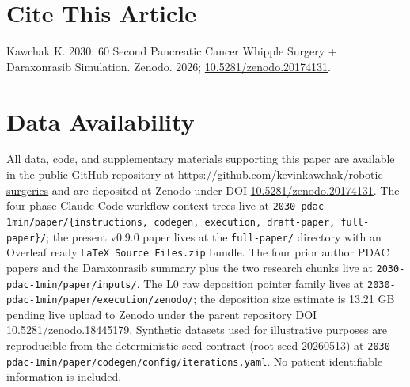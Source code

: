 {}
\section*{Cite This Article}
\label{sec:cite}

Kawchak K. 2030: 60 Second Pancreatic Cancer Whipple Surgery +
Daraxonrasib Simulation. Zenodo. 2026;
\href{https://doi.org/10.5281/zenodo.20174131}{10.5281/zenodo.20174131}.

{}
\section*{Data Availability}
\label{sec:data}

All data, code, and supplementary materials supporting this paper
are available in the public GitHub repository at
\url{https://github.com/kevinkawchak/robotic-surgeries} and are
deposited at Zenodo under DOI
\href{https://doi.org/10.5281/zenodo.20174131}{10.5281/zenodo.20174131}.
The four phase Claude Code workflow context trees live at
\texttt{2030-pdac-1min/paper/\{instructions, codegen, execution,
draft-paper, full-paper\}/}; the present v0.9.0 paper lives at the
\texttt{full-paper/} directory with an Overleaf ready
\texttt{LaTeX Source Files.zip} bundle. The four prior author PDAC
papers and the Daraxonrasib summary plus the two research chunks
live at \texttt{2030-pdac-1min/paper/inputs/}. The L0 raw
deposition pointer family lives at
\texttt{2030-pdac-1min/paper/execution/zenodo/}; the deposition
size estimate is 13.21 GB pending live upload to Zenodo under the
parent repository DOI 10.5281/zenodo.18445179. Synthetic datasets
used for illustrative purposes are reproducible from the
deterministic seed contract (root seed 20260513) at
\texttt{2030-pdac-1min/paper/codegen/config/iterations.yaml}. No
patient identifiable information is included.

